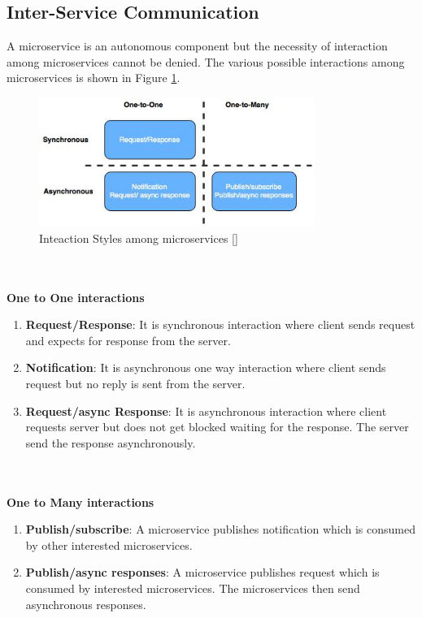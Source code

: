 \subsection{Inter-Service Communication}\label{section:challanges_of_microservices_architecture/integration/inter_service_communication}
A microservice is an autonomous component but the necessity of interaction among microservices cannot be denied. The various possible interactions among microservices is shown in Figure \ref{fig:challanges_of_microservices_architecture/integration/inter_service_communication/interaction_styles_among_microservices}.\cite{Richardson:2015ab}
\begin{figure}[H]
\begin{center}
\includegraphics[width=0.8\textwidth]{figures/challenges_one_interaction_styles}
\caption{Inteaction Styles among microservices [\cite{Richardson:2015ab}]}
\label{fig:challanges_of_microservices_architecture/integration/inter_service_communication/interaction_styles_among_microservices}
\end{center}
\end{figure}
\\
\\
\textbf{One to One interactions}
\\
\begin{enumerate}
\item \textbf{Request/Response}: It is synchronous interaction where client sends request and expects for response from the server.
\item \textbf{Notification}: It is asynchronous one way interaction where client sends request but no reply is sent from the server.
\item \textbf{Request/async Response}: It is asynchronous interaction where client requests server but does not get blocked waiting for the response. The server send the response asynchronously.
\end{enumerate}
\\
\\
\textbf{One to Many interactions}
\\
\begin{enumerate}
\item \textbf{Publish/subscribe}: A microservice publishes notification which is consumed by other interested microservices.
\item \textbf{Publish/async responses}: A microservice publishes request which is consumed by interested microservices. The microservices then send asynchronous responses.
\end{enumerate}
\\
\\

